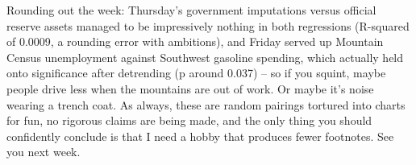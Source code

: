 Rounding out the week: Thursday's government imputations versus official reserve assets managed to be impressively nothing in both regressions (R-squared of 0.0009, a rounding error with ambitions), and Friday served up Mountain Census unemployment against Southwest gasoline spending, which actually held onto significance after detrending (p around 0.037) -- so if you squint, maybe people drive less when the mountains are out of work. Or maybe it's noise wearing a trench coat. As always, these are random pairings tortured into charts for fun, no rigorous claims are being made, and the only thing you should confidently conclude is that I need a hobby that produces fewer footnotes. See you next week.
